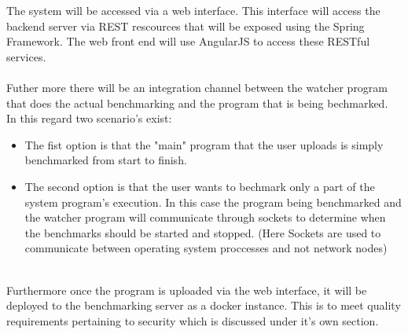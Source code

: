 The system will be accessed via a web interface. This interface will access the
backend server via REST rescources that will be exposed using the Spring
Framework. The web front end will use AngularJS to access these RESTful services.\\ \\
Futher more there will be an integration channel between the watcher program that
does the actual benchmarking and the program that is being bechmarked.\\
In this regard two scenario's exist:
\begin{itemize}
	\item The fist option is that the "main" program that the user uploads is simply
	benchmarked from start to finish.
	\item The second option is that the user wants to bechmark only a part of the
	system program's execution. In this case the program being benchmarked and
	the watcher program will communicate through sockets to determine when the
	benchmarks should be started and stopped. (Here Sockets are used to communicate
	between operating system proccesses and not network nodes)
\end{itemize}
\\Furthermore once the program is uploaded via the web interface, it will be deployed
to the benchmarking server as a docker instance. This is to meet quality requirements
pertaining to security which is discussed under it's own section.
